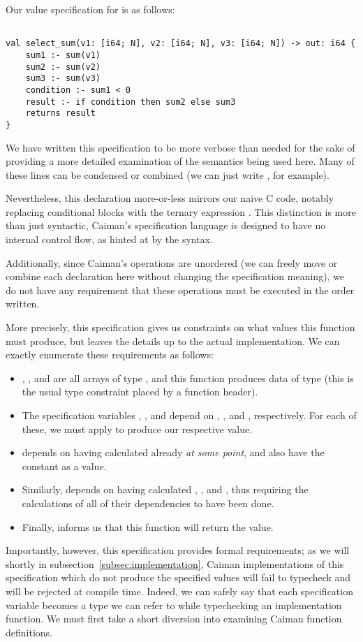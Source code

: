Our value specification for  is as follows:
%
\begin{lstlisting}

val select_sum(v1: [i64; N], v2: [i64; N], v3: [i64; N]) -> out: i64 {
    sum1 :- sum(v1)
    sum2 :- sum(v2)
    sum3 :- sum(v3)
    condition :- sum1 < 0
    result :- if condition then sum2 else sum3
    returns result
}
\end{lstlisting}
%
We have written this specification to be more verbose than needed for the sake of providing a more detailed examination of the semantics being used here.  Many of these lines can be condensed or combined (we can just write , for example).

Nevertheless, this declaration more-or-less mirrors our naive C code, notably replacing conditional  blocks with the ternary expression .  This distinction is more than just syntactic, Caiman's specification language is designed to have no internal control flow, as hinted at by the syntax.

Additionally, since Caiman's operations are unordered (we can freely move or combine each declaration here without changing the specification meaning), we do not have any requirement that these operations must be executed in the order written.

More precisely, this specification gives us constraints on what values this function must produce, but leaves the details up to the actual implementation.  We can exactly enumerate these requirements as follows:
%
\begin{itemize}
\item {}, , and  are all arrays of type , and this function produces data of type  (this is the usual type constraint placed by a function header).
\item The specification variables , , and  depend on , , and , respectively.  For each of these, we must apply  to produce our respective value.
\item {} depends on having calculated  already \textit{at some point}, and also have the constant  as a value.
\item Similarly,  depends on having calculated , , and , thus requiring the calculations of all of their dependencies to have been done.
\item Finally,  informs us that this function will return the  value.
\end{itemize}
%
Importantly, however, this specification provides formal requirements; as we will shortly in subsection~\ref{subsec:implementation}, Caiman implementations of this specification which do not produce the specified values will fail to typecheck and will be rejected at compile time.  Indeed, we can safely say that each specification variable becomes a type we can refer to while typechecking an implementation function.  We must first take a short diversion into examining Caiman function definitions.

